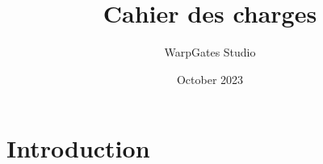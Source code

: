\documentclass{article}
\title{Cahier des charges}
\author{WarpGates Studio}
\date{October 2023}
\begin{document}
\maketitle

\section{Introduction}
\end{document}
